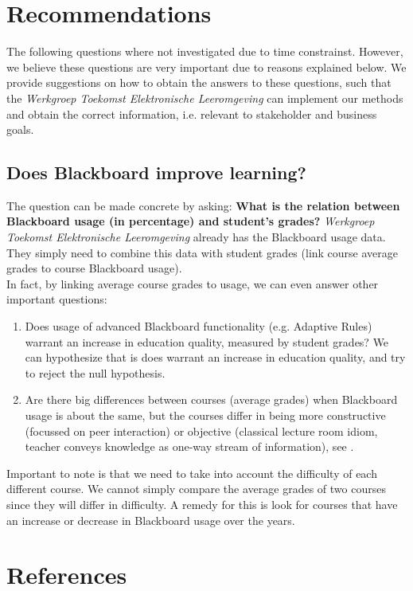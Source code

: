 \chapter{Recommendations}
The following questions where not investigated due to time constrainst. However, we believe these questions are very important due to reasons explained below. We provide suggestions on how to obtain the answers to these questions, such that the \textit{Werkgroep Toekomst Elektronische Leeromgeving} can implement our methods and obtain the correct information, i.e. relevant to stakeholder and business goals.

\section{Does Blackboard improve learning?}
The question can be made concrete by asking:\textbf{ What is the relation between Blackboard usage (in percentage) and student's grades?} \textit{Werkgroep Toekomst Elektronische Leeromgeving} already has the Blackboard usage data. They simply need to combine this data with student grades (link course average grades to course Blackboard usage). \\

In fact, by linking average course grades to usage, we can even answer other important questions:
\begin{enumerate}
	\item Does usage of advanced Blackboard functionality (e.g. Adaptive Rules) warrant an increase in education quality, measured by student grades? We can hypothesize that is does warrant an increase in education quality, and try to reject the null hypothesis.
	\item Are there big differences between courses (average grades) when Blackboard usage is about the same, but the courses differ in being more constructive (focussed on peer interaction) or objective (classical lecture room idiom, teacher conveys knowledge as one-way stream of information), see \cite{improveEducationWithIt}. 
\end{enumerate}

Important to note is that we need to take into account the difficulty of each different course. We cannot simply compare the average grades of two courses since they will differ in difficulty. A remedy for this is look for courses that have an increase or decrease in Blackboard usage over the years. 


\chapter{References}

